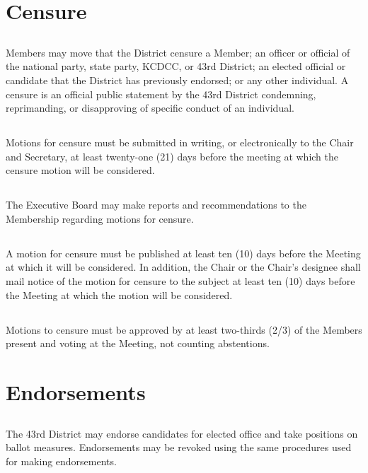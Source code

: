 \section{Censure}
\subsection{}
Members may move that the \fortythird{} District censure a Member; an officer or official of the national party, state party, KCDCC, or 43rd District; an elected official or candidate that the \fortythird{} District has previously endorsed; or any other individual. A censure is an official public statement by the 43rd District condemning, reprimanding, or disapproving of specific conduct of an individual.

\subsection{}
Motions for censure must be submitted in writing, or electronically to the Chair and Secretary, at least twenty-one (21) days before the meeting at which the censure motion will be considered.

\subsection{}
The Executive Board may make reports and recommendations to the Membership regarding motions for censure.

\subsection{}
A motion for censure must be published at least ten (10) days before the Meeting at which it will be considered. In addition, the Chair or the Chair’s designee shall mail notice of the motion for censure to the subject at least ten (10) days before the Meeting at which the motion will be considered.

\subsection{}
Motions to censure must be approved by at least two-thirds (2/3) of the Members present and voting at the Meeting, not counting abstentions.

\section{Endorsements}
\subsection{}
The 43rd District may endorse candidates for elected office and take positions on ballot measures.  Endorsements may be revoked using the same procedures used for making endorsements.

